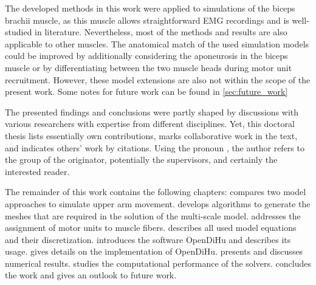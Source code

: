 The developed methods in this work were applied to simulations of the biceps brachii muscle, as this muscle allows straightforward EMG recordings and is well-studied in literature. Nevertheless, most of the methods and results are also applicable to other muscles. The anatomical match of the used simulation models could be improved by additionally considering the aponeurosis in the biceps muscle or by differentiating between the two muscle heads during motor unit recruitment. However, these model extensions are also not within the scope of the present work.
Some notes for future work can be found in \cref{sec:future_work}

The presented findings and conclusions were partly shaped by discussions with various researchers with expertise from different disciplines. Yet, this doctoral thesis lists essentially own contributions, marks collaborative work in the text, and indicates others' work by citations.
Using the pronoun , the author refers to the group of the originator, potentially the supervisors, and certainly the interested reader.

The remainder of this work contains the following chapters:
 compares two model approaches to simulate upper arm movement.  develops algorithms to generate the meshes that are required in the solution of the multi-scale model.  addresses the assignment of motor units to muscle fibers.  describes all used model equations and their discretization.  introduces the software OpenDiHu and describes its usage.  gives details on the implementation of OpenDiHu.  presents and discusses numerical results.  studies the computational performance of the solvers.  concludes the work and gives an outlook to future work.









